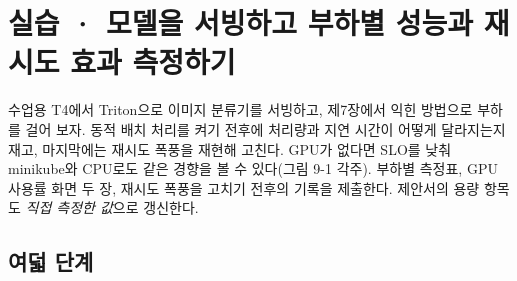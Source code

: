 \section{실습 · 모델을 서빙하고 부하별 성능과 재시도 효과 측정하기}

수업용 T4에서 Triton으로 이미지 분류기를 서빙하고, 제7장에서 익힌 방법으로 부하를 걸어 보자. 동적 배치 처리를 켜기 전후에 처리량과 지연 시간이 어떻게 달라지는지 재고, 마지막에는 재시도 폭풍을 재현해 고친다. GPU가 없다면 SLO를 낮춰 minikube와 CPU로도 같은 경향을 볼 수 있다(그림 9-1 각주). 부하별 측정표, GPU 사용률 화면 두 장, 재시도 폭풍을 고치기 전후의 기록을 제출한다. 제안서의 용량 항목도 \textit{직접 측정한 값}으로 갱신한다.

\subsection*{여덟 단계}


